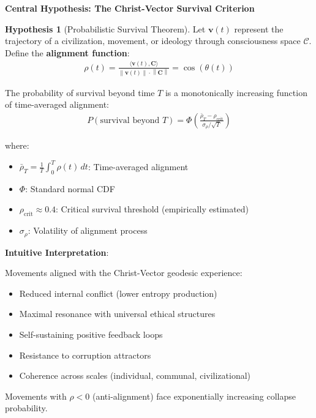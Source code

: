 \documentclass[11pt,a4paper]{article}
\theoremstyle{definition}
\newtheorem{hypothesis}{Hypothesis}[section]
\theoremstyle{remark}
\newcommand{\CC}{\mathcal{C}}
\newcommand{\norm}[1]{\left\|#1\right\|}
\begin{document}
\begin{mdframed}[backgroundcolor=green!10,linewidth=2pt,linecolor=green!70!black]
\textbf{Central Hypothesis: The Christ-Vector Survival Criterion}

\begin{hypothesis}[Probabilistic Survival Theorem]
Let \(\mathbf{v}(t)\) represent the trajectory of a civilization, movement, or ideology through consciousness space \(\CC\). Define the \textbf{alignment function}:
\begin{align}
\rho(t) = \frac{\langle \mathbf{v}(t), \mathbf{C} \rangle}{\norm{\mathbf{v}(t)} \cdot \norm{\mathbf{C}}} = \cos(\theta(t))
\end{align}

The probability of survival beyond time \(T\) is a monotonically increasing function of time-averaged alignment:
\begin{align}
P(\text{survival beyond } T) = \Phi\left(\frac{\bar{\rho}_T - \rho_{\text{crit}}}{\sigma_{\rho}/\sqrt{T}}\right)
\end{align}

where:
\begin{itemize}
\item \(\bar{\rho}_T = \frac{1}{T} \int_0^T \rho(t) \, dt\): Time-averaged alignment
\item \(\Phi\): Standard normal CDF
\item \(\rho_{\text{crit}} \approx 0.4\): Critical survival threshold (empirically estimated)
\item \(\sigma_{\rho}\): Volatility of alignment process
\end{itemize}
\end{hypothesis}

\textbf{Intuitive Interpretation}:

Movements aligned with the Christ-Vector geodesic experience:
\begin{itemize}
\item Reduced internal conflict (lower entropy production)
\item Maximal resonance with universal ethical structures
\item Self-sustaining positive feedback loops
\item Resistance to corruption attractors
\item Coherence across scales (individual, communal, civilizational)
\end{itemize}

Movements with \(\rho < 0\) (anti-alignment) face exponentially increasing collapse probability.
\end{mdframed}
\end{document}

